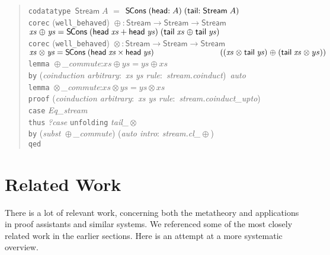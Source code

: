 \documentclass[preprint,draft]
{sigplanconf}
\newcommand\TC{\mathsf}
\newcommand\keyw[1]{\texttt{#1}}
\newcommand{\ra}{\rightarrow}
\newcommand{\<}{\langle}
\renewcommand{\>}{\rangle}
\newcommand{\hd}{{{\mathsf{head}}}}
\newcommand{\tl}{{{\mathsf{tail}}}}
\newcommand{\SCons}{{{\mathsf{S\hspace*{-0.2ex}Cons}}}}
\newcommand{\opls}{\mathrel\oplus}
\newcommand{\oprd}{\mathrel\otimes}
\newcommand{\xs}{{\mathit{xs}}}
\newcommand{\ys}{{\mathit{ys}}}
\newcommand\Stream{\TC{Stream}}
\begin{document}
\begin{quote}
  \keyw{codatatype} \,$\Stream\; A$ $=$ $\SCons\;(\hd{:}\; A)\;(\tl{:}\; \Stream\; A)$
\\[2\jot]
  \keyw{corec} (\keyw{well\_behaved}) ${\opls} : {}\Stream \ra \Stream \ra \Stream$ \\
  \hbox{}\quad$\xs \opls \ys  =  {\SCons}\;(\hd\;\xs + \hd\;\ys)\;(\tl\;\xs \opls \tl\;\ys)$
\\[2\jot]
  \keyw{corec} (\keyw{well\_behaved}) ${\oprd} : \Stream \ra \Stream \ra \Stream$ \\
  \hbox{}\quad$\xs \oprd \ys  =  {\SCons}\;(\hd\;\xs \times \hd\;\ys)\;\\
  \phantom{\hbox{}\quad\xs \oprd \ys  =  {\SCons}\;}((\xs \oprd \tl\;\ys) \opls (\tl\;\xs \oprd ys))$
\\[2\jot]
  \keyw{lemma} \textit{$\opls$\_commute}:\enskip $\xs \opls \ys = \ys \opls \xs$ \\
  \hbox{}\quad\keyw{by} (\textit{coinduction arbitrary}:\ \textit{xs ys rule}:\ \textit{stream.coinduct})~\textit{auto}\kern-200mm
\\[2\jot]
  \keyw{lemma} \textit{$\oprd$\_commute}:\enskip $\xs \oprd \ys = \ys \oprd \xs$ \\
  \keyw{proof} (\textit{coinduction arbitrary}:\ \textit{xs ys rule}:\ \textit{stream.coinduct\_upto})\kern-200mm \\
  \hbox{}\quad\keyw{case} \textit{Eq\_stream} \\
  \hbox{}\quad\keyw{thus} \textit{?case} \keyw{unfolding} \textit{tail\_$\oprd$} \\
  \hbox{}\qquad\keyw{by} (\textit{subst} \textit{$\opls$\_commute}) (\textit{auto intro}: \textit{stream.cl\_$\opls$}) \\
  \keyw{qed}
\end{quote}






\section{Related Work}
\label{sec-rel}

There is a lot of relevant work, concerning both the metatheory and applications
in proof assistants and similar systems. We referenced some of the most closely
related work in the earlier sections. Here is an attempt at a more systematic overview.
\end{document}
